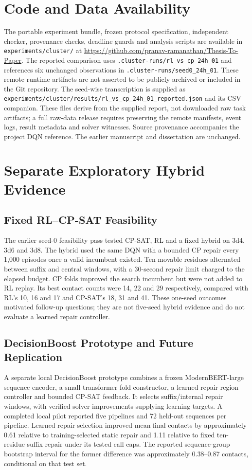 \documentclass{article}
\theoremstyle{plain}
\theoremstyle{definition}
\begin{document}
\section*{Code and Data Availability}
The portable experiment bundle, frozen protocol specification, independent checker, provenance checks, deadline guards and analysis scripts are available in \texttt{experiments/cluster/} at
\url{https://github.com/pranav-ramanathan/Thesis-To-Paper}. The reported comparison uses \texttt{.cluster-runs/rl\_vs\_cp\_24h\_01} and references six unchanged observations in \texttt{.cluster-runs/seed0\_24h\_01}. These remote runtime artifacts are not asserted to be publicly archived or included in the Git repository. The seed-wise transcription is supplied as \texttt{experiments/cluster/results/rl\_vs\_cp\_24h\_01\_reported.json} and its CSV companion. These files derive from the supplied report, not downloaded raw task artifacts; a full raw-data release requires preserving the remote manifests, event logs, result metadata and solver witnesses. Source provenance accompanies the project DQN reference. The earlier manuscript and dissertation are unchanged.

\appendix
\section{Separate Exploratory Hybrid Evidence}\label{sec:exploratory}
\subsection{Fixed RL--CP-SAT Feasibility}
The earlier seed-0 feasibility pass tested CP-SAT, RL and a fixed hybrid on 3d4, 3d6 and 3d8. The hybrid used the same DQN with a bounded CP repair every 1,000 episodes once a valid incumbent existed. Ten movable residues alternated between suffix and central windows, with a 30-second repair limit charged to the elapsed budget. CP folds improved the search incumbent but were not added to RL replay. Its best contact counts were 14, 22 and 29 respectively, compared with RL's 10, 16 and 17 and CP-SAT's 18, 31 and 41. These one-seed outcomes motivated follow-up questions; they are not five-seed hybrid evidence and do not evaluate a learned repair controller.

\subsection{DecisionBoost Prototype and Future Replication}
A separate local DecisionBoost prototype combines a frozen ModernBERT-large sequence encoder, a small transformer fold constructor, a learned repair-region controller and bounded CP-SAT feedback. It selects suffix/internal repair windows, with verified solver improvements supplying learning targets. A completed local pilot reported five pipelines and 72 held-out sequences per pipeline. Learned repair selection improved mean final contacts by approximately 0.61 relative to training-selected static repair and 1.11 relative to fixed ten-residue suffix repair under its tested call caps. The reported sequence-group bootstrap interval for the former difference was approximately 0.38--0.87 contacts, conditional on that test set.
\end{document}
